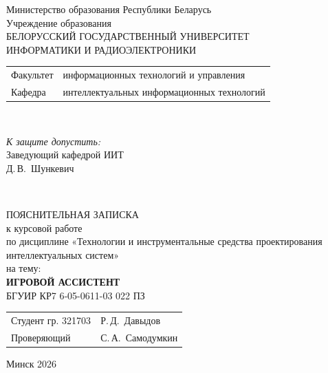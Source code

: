 \begin{titlepage}
  \begin{center}
    Министерство образования Республики Беларусь\\[1em]
    Учреждение образования\\
    БЕЛОРУССКИЙ ГОСУДАРСТВЕННЫЙ УНИВЕРСИТЕТ \\
    ИНФОРМАТИКИ И РАДИОЭЛЕКТРОНИКИ\\[1em]

    \begin{minipage}{\textwidth}
      \begin{flushleft}
        \begin{tabular}{ l l }
          Факультет & информационных технологий и управления\\
          Кафедра   & интеллектуальных информационных технологий
        \end{tabular}
      \end{flushleft}
    \end{minipage}\\[1em]

    \begin{flushright}
      \begin{minipage}{0.4\textwidth}
        \textit{К защите допустить:}\\[0.8em]
        Заведующий кафедрой ИИТ\\[0.45em]
        \underline{\hspace*{2.8cm}} Д.\,В.~Шункевич
      \end{minipage}\\[2.2em]
    \end{flushright}

    {ПОЯСНИТЕЛЬНАЯ ЗАПИСКА}\\
    {к курсовой работе}\\
    {по дисциплине «Технологии и инструментальные средства проектирования интеллектуальных систем»}\\
    {на тему:}\\[1em]
    \textbf{\large ИГРОВОЙ АССИСТЕНТ}\\[1em]


    {БГУИР КР7 6‑05-0611-03 022 ПЗ}\\[2em]
    \vspace{2em}
    \begin{tabular}{ p{}p{} }
      Студент гр. 321703 & Р.\,Д.~Давыдов \\
      Проверяющий & С.\,А.~Самодумкин \\
    \end{tabular}
    
    \vfill
    {\normalsize Минск 2026}
  \end{center}
\end{titlepage}
